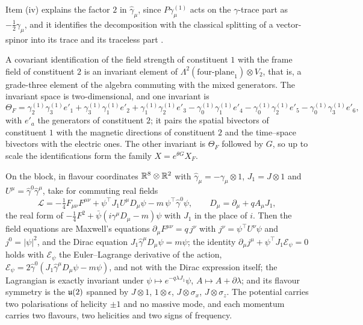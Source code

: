 Item (iv) explains the factor $2$ in $\hat\gamma_\mu$, since $P\gamma^{(1)}_\mu$ acts on the $\gamma$-trace part as $-\tfrac12\gamma_\mu$, and it
identifies the decomposition with the classical splitting of a vector-spinor into its trace and its traceless part
\cite{RaritaSchwinger41}.

A covariant identification of the field strength of constituent $1$ with the frame field of constituent $2$ is an invariant element
of $\Lambda^2(\text{four-plane}_1)\otimes V_2$, that is, a grade-three element of the algebra commuting with the mixed generators. The
invariant space is two-dimensional, and one invariant is
\[
\Theta_F=\gamma^{(1)}_2\gamma^{(1)}_3e'_1+\gamma^{(1)}_3\gamma^{(1)}_1e'_2+\gamma^{(1)}_1\gamma^{(1)}_2e'_3
-\gamma^{(1)}_0\gamma^{(1)}_1e'_4-\gamma^{(1)}_0\gamma^{(1)}_2e'_5-\gamma^{(1)}_0\gamma^{(1)}_3e'_6 ,
\]
with $e'_a$ the generators of constituent $2$; it pairs the spatial bivectors of constituent $1$ with the magnetic directions of
constituent $2$ and the time--space bivectors with the electric ones. The other invariant is $\Theta_F$ followed by $G$, so up to scale
the identifications form the family $X=e^{\theta G}X_F$.

\begin{theorem}
\label{thm:coupled}
On the block, in flavour coordinates $\mathbb{R}^8\otimes\mathbb{R}^2$ with $\hat\gamma_\mu=-\gamma_\mu\otimes1$, $J_1=J\otimes1$ and $U^\mu=\hat\gamma^0\hat\gamma^\mu$, take
for commuting real fields
\begin{equation}
\label{eq:coupledL}
\mathcal L=-\tfrac14F_{\mu\nu}F^{\mu\nu}+\psi^{\!\top}J_1U^\mu D_\mu\psi-m\,\psi^{\!\top}\hat\gamma^0\psi,\qquad D_\mu=\partial_\mu+qA_\mu J_1 ,
\end{equation}
the real form of $-\tfrac14F^2+\bar\psi(i\gamma^\mu D_\mu-m)\psi$ with $J_1$ in the place of $i$. Then the field equations are Maxwell's
equations $\partial_\mu F^{\mu\nu}=q\,j^\nu$ with $j^\nu=\psi^{\!\top}U^\nu\psi$ and $j^0=|\psi|^2$, and the Dirac equation
$J_1\hat\gamma^\mu D_\mu\psi=m\psi$; the identity $\partial_\mu j^\mu+\psi^{\!\top}J_1\mathcal E_\psi=0$ holds with $\mathcal E_\psi$ the Euler--Lagrange
derivative of the action, $\mathcal E_\psi=2\hat\gamma^0(J_1\hat\gamma^\mu D_\mu\psi-m\psi)$, and not with the Dirac expression itself; the Lagrangian is exactly invariant under $\psi\mapsto e^{-q\lambda J_1}\psi$, $A\mapsto A+\partial\lambda$; and its flavour
symmetry is the $\mathfrak{u}(2)$ spanned by $J\otimes1$, $1\otimes\epsilon$, $J\otimes\sigma_x$, $J\otimes\sigma_z$. The potential carries two
polarisations of helicity $\pm1$ and no massive mode, and each momentum carries two flavours, two helicities and two signs of frequency.
\end{theorem}

